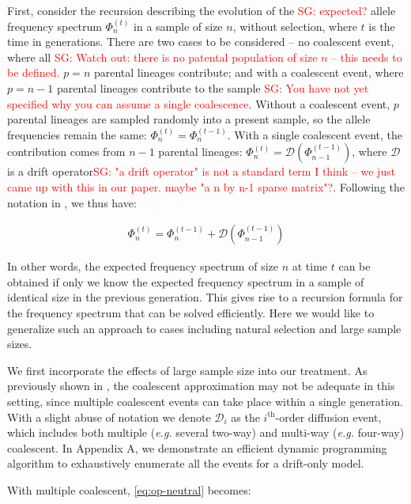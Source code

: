 \documentclass[review]{elsarticle}
\newcommand{\sgcomment}[1]{\textcolor{red}{SG: #1}}
\begin{document}
First, consider the recursion describing the evolution of the \sgcomment{expected?} allele frequency spectrum
$\Phi_{n}^{(t)}$ in a sample of size $n$, without selection, where $t$ is the time in generations. There are two cases to be considered --
no coalescent event, where all \sgcomment{Watch out: there is no patental population of size $n$ -- this needs to be defined.} $p=n$ parental lineages contribute; and with a coalescent event,
where $p=n-1$ parental lineages contribute to the sample \sgcomment{You have not yet specified why you can assume a single coalescence}. Without a coalescent event, $p$ parental
lineages are sampled randomly into a present sample, so the allele frequencies remain the same:
$\Phi_{n}^{(t)}=\Phi_{n}^{(t-1)}$. With a single coalescent event, the contribution comes from $n-1$
parental lineages: $\Phi_{n}^{(t)}=\mathcal{D}(\Phi_{n-1}^{(t-1)})$, where $\mathcal{D}$ is a drift
operator\sgcomment{"a drift operator" is not a standard term I think -- we just came up with this in our paper. maybe "a n by n-1 sparse matrix"?}. Following the notation in \cite{JouganousEtAl2017}, we thus have:

\begin{align}
  \label{eq:op-neutral}
  \Phi_{n}^{(t)}=\Phi_{n}^{(t-1)}+\mathcal{D}(\Phi_{n-1}^{(t-1)})
\end{align}

In other words, the expected frequency spectrum of size $n$ at time $t$ can be obtained if only we know the expected frequency spectrum in a sample of identical size in the previous generation. This gives rise to a recursion formula for the frequency spectrum that can be solved efficiently\cite{JouganousEtAl2017}. Here we would like to generalize such an approach to cases including natural selection and large sample sizes.  


We first incorporate the effects of large sample size into our treatment. As previously shown in
\cite{BhaskarEtAl2014,NelsonEtAl2019}, the coalescent approximation may not be adequate in this
setting, since multiple coalescent events can take place within a single generation. With a slight
abuse of notation we denote $\mathcal{D}_i$ as the $i^{\text{th}}$-order diffusion event, which includes both
multiple (\textit{e.g.} several two-way) and multi-way (\textit{e.g.} four-way) coalescent. In
Appendix A, we demonstrate an efficient dynamic programming algorithm to exhaustively enumerate all
the events for a drift-only model.

With multiple coalescent, \eqref{eq:op-neutral} becomes:
\end{document}
